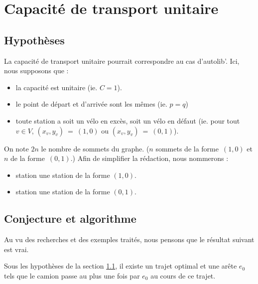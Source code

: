 \chapter{Capacité de transport unitaire}
\label{Capacite unitaire}

\section{Hypothèses}
\label{Capacité unitaire - hypothèse}

La capacité de transport unitaire pourrait correspondre au cas d'autolib'. Ici, nous supposons que :
\begin{itemize}
\item la capacité est unitaire (ie. $C=1$).
\item le point de départ et d'arrivée sont les mêmes (ie. $p=q$)
\item toute station a soit un vélo en excès, soit un vélo en défaut (ie. pour tout $v \in V$, $(x_v,y_v)~=~(1,0)$ ou $(x_v,y_v)~=~(0,1)$).
\end{itemize}
On note $2n$ le nombre de sommets du graphe. ($n$ sommets de la forme~$(1,0)$ et $n$ de la forme~$(0,1)$.) Afin de simplifier la rédaction, nous nommerons :
\begin{itemize}
\item station \plus une station de la forme $(1,0)$.
\item station \moins une station de la forme $(0,1)$.
\end{itemize}

\section{Conjecture et algorithme}
\label{capacité unitaire - conjecture et algorithme}

Au vu des recherches et des exemples traités, nous pensons que le résultat suivant est vrai.

\begin{conj} \label{conj: capacité unitaire - un passage}
Sous les hypothèses de la section \ref{Capacité unitaire - hypothèse}, il existe un trajet optimal et une arête $e_0$ tels que le camion passe au plus une fois par $e_0$ au cours de ce trajet.
\end{conj}

